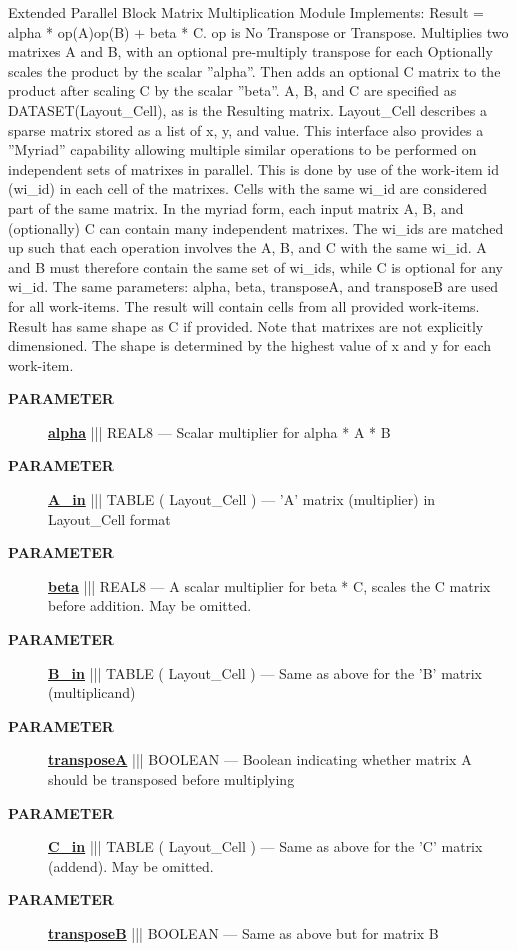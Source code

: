Extended Parallel Block Matrix Multiplication Module Implements: Result = alpha * op(A)op(B) + beta * C. op is No Transpose or Transpose. Multiplies two matrixes A and B, with an optional pre-multiply transpose for each Optionally scales the product by the scalar ''alpha''. Then adds an optional C matrix to the product after scaling C by the scalar ''beta''. A, B, and C are specified as DATASET(Layout\_Cell), as is the Resulting matrix. Layout\_Cell describes a sparse matrix stored as a list of x, y, and value. This interface also provides a ''Myriad'' capability allowing multiple similar operations to be performed on independent sets of matrixes in parallel. This is done by use of the work-item id (wi\_id) in each cell of the matrixes. Cells with the same wi\_id are considered part of the same matrix. In the myriad form, each input matrix A, B, and (optionally) C can contain many independent matrixes. The wi\_ids are matched up such that each operation involves the A, B, and C with the same wi\_id. A and B must therefore contain the same set of wi\_ids, while C is optional for any wi\_id. The same parameters: alpha, beta, transposeA, and transposeB are used for all work-items. The result will contain cells from all provided work-items. Result has same shape as C if provided. Note that matrixes are not explicitly dimensioned. The shape is determined by the highest value of x and y for each work-item.






\par
\begin{description}
\item [\colorbox{tagtype}{\color{white} \textbf{\textsf{PARAMETER}}}] \textbf{\underline{alpha}} ||| REAL8 --- Scalar multiplier for alpha * A * B
\item [\colorbox{tagtype}{\color{white} \textbf{\textsf{PARAMETER}}}] \textbf{\underline{A\_in}} ||| TABLE ( Layout\_Cell ) --- 'A' matrix (multiplier) in Layout\_Cell format
\item [\colorbox{tagtype}{\color{white} \textbf{\textsf{PARAMETER}}}] \textbf{\underline{beta}} ||| REAL8 --- A scalar multiplier for beta * C, scales the C matrix before addition. May be omitted.
\item [\colorbox{tagtype}{\color{white} \textbf{\textsf{PARAMETER}}}] \textbf{\underline{B\_in}} ||| TABLE ( Layout\_Cell ) --- Same as above for the 'B' matrix (multiplicand)
\item [\colorbox{tagtype}{\color{white} \textbf{\textsf{PARAMETER}}}] \textbf{\underline{transposeA}} ||| BOOLEAN --- Boolean indicating whether matrix A should be transposed before multiplying
\item [\colorbox{tagtype}{\color{white} \textbf{\textsf{PARAMETER}}}] \textbf{\underline{C\_in}} ||| TABLE ( Layout\_Cell ) --- Same as above for the 'C' matrix (addend). May be omitted.
\item [\colorbox{tagtype}{\color{white} \textbf{\textsf{PARAMETER}}}] \textbf{\underline{transposeB}} ||| BOOLEAN --- Same as above but for matrix B
\end{description}







